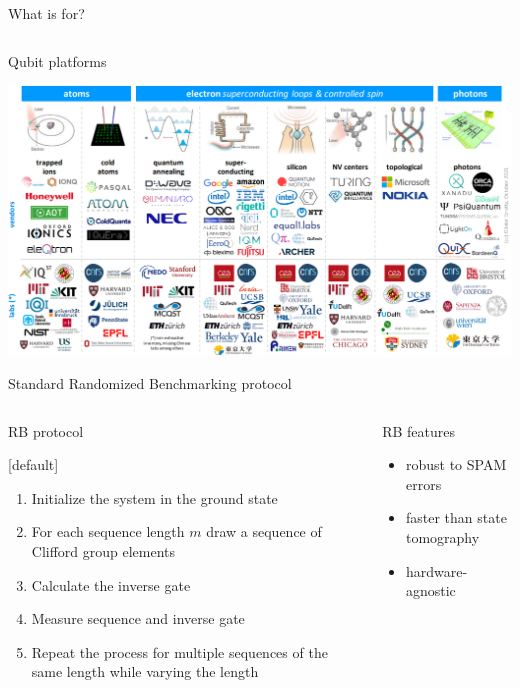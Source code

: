 \documentclass[aspectratio=169,10pt]{beamer}
\begin{document}
\begin{frame}{What is for?}
\begin{columns}
\begin{column}{0.5\textwidth}
\begin{center}
        \end{center}
      \end{column}
  \end{columns}
\end{frame}

\begin{frame}{Qubit platforms}
  \begin{center}
      \includegraphics[height=0.82\textheight]{figures/platforms.png}
  \end{center}
\end{frame}

\begin{frame}[fragile]{Standard Randomized Benchmarking protocol}
    \begin{columns}
      \begin{column}{0.5\textwidth}
        RB protocol
      {[default]
       \begin{enumerate}[leftmargin=*, label=\arabic*.]
         \item Initialize the system in the ground state
         \item For each sequence length $m$ draw a sequence of Clifford group elements
         \item Calculate the inverse gate 
         \item Measure sequence and inverse gate
         \item Repeat the process for multiple sequences of the same length while varying the length
       \end{enumerate}}
      \end{column}
      \begin{column}{0.5\textwidth}
        RB features
        \begin{itemize}
          \item robust to SPAM errors
          \hspace{10mm}
          \item faster than state tomography
          \hspace{10mm}
          \item hardware-agnostic 
        \end{itemize}
      \end{column}
    \end{columns}
\end{frame}
\end{document}
